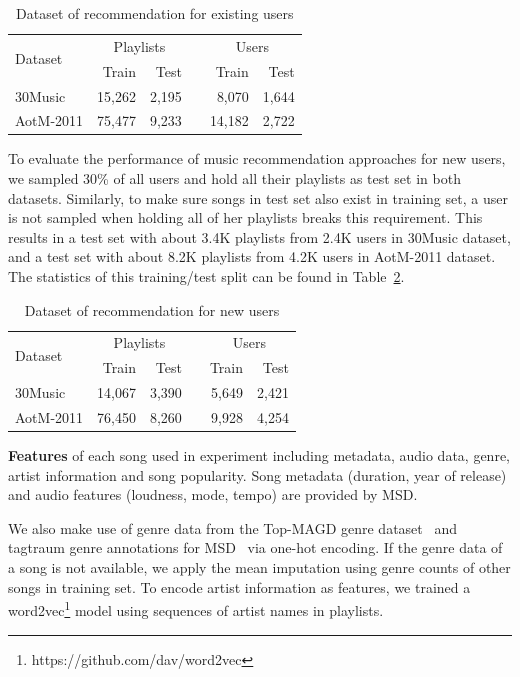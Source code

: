 \begin{table}[!h]
\centering
\caption{Dataset of recommendation for existing users}
\label{tab:stats_warm}
\begin{tabular}{lrrcrr}
\toprule
\multirow{2}{*}{Dataset}  & \multicolumn{2}{c}{Playlists} && \multicolumn{2}{c}{Users} \\ \cmidrule{2-3} \cmidrule{5-6}
                          & Train & Test && Train & Test \\
\midrule
30Music   & 15,262 & 2,195 &&  8,070 & 1,644 \\
AotM-2011 & 75,477 & 9,233 && 14,182 & 2,722 \\
\bottomrule
\end{tabular}
\end{table}

To evaluate the performance of music recommendation approaches for new users,
we sampled 30\% of all users and hold all their playlists as test set in both datasets.
Similarly, to make sure songs in test set also exist in training set,
a user is not sampled when holding all of her playlists breaks this requirement.
This results in a test set with about 3.4K playlists from 2.4K users in 30Music dataset,
and a test set with about 8.2K playlists from 4.2K users in AotM-2011 dataset.
The statistics of this training/test split can be found in Table~\ref{tab:stats_cold}.

\begin{table}[!h]
\centering
\caption{Dataset of recommendation for new users}
\label{tab:stats_cold}
\begin{tabular}{lrrcrr}
\toprule
\multirow{2}{*}{Dataset}  & \multicolumn{2}{c}{Playlists} && \multicolumn{2}{c}{Users} \\ \cmidrule{2-3} \cmidrule{5-6}
                          & Train & Test && Train & Test \\
\midrule
30Music   & 14,067 & 3,390 && 5,649 & 2,421 \\
AotM-2011 & 76,450 & 8,260 && 9,928 & 4,254 \\
\bottomrule
\end{tabular}
\end{table}


{\bf Features} of each song used in experiment including metadata, audio data, genre, artist information and song popularity.
Song metadata (\eg duration, year of release) and audio features (\eg loudness, mode, tempo) are provided by MSD.

We also make use of genre data from the Top-MAGD genre dataset~\cite{schindler2012facilitating}
and tagtraum genre annotations for MSD~\cite{schreiber2015improving} via one-hot encoding.
If the genre data of a song is not available, we apply the mean imputation using genre counts of other songs in training set.
To encode artist information as features,
we trained a word2vec\footnote{https://github.com/dav/word2vec} model using sequences of artist names in playlists.

